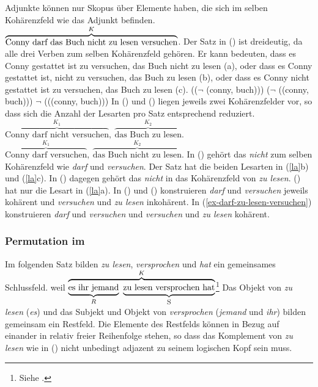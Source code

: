 Adjunkte können nur Skopus über Elemente haben, die sich im selben Kohärenzfeld
wie das Adjunkt befinden.
\ea
\label{ex-darf-zu-lesen-versuchen}
$\overbrace{ \mbox{Conny darf\iw{dürfen} das Buch nicht zu lesen versuchen} }^{K}$.
\z
Der Satz in () ist dreideutig, da alle drei Verben zum selben Kohärenzfeld
gehören. Er kann bedeuten, dass es Conny gestattet ist zu versuchen,
das Buch nicht zu lesen (a), oder dass es Conny gestattet ist, nicht zu versuchen, das Buch zu lesen (b),
oder dass es Conny nicht gestattet ist zu versuchen, das Buch zu lesen (c).
\eal
\label{la}
\ex {}(($\neg$ (conny, buch)))
\ex {}($\neg$ ((conny, buch)))
\ex $\neg$ (((conny, buch)))
\zl
In () und () liegen jeweils zwei Kohärenzfelder vor, so dass
sich die Anzahl der Lesarten pro Satz entsprechend reduziert.
\ea
$\overbrace{ \mbox{Conny darf nicht versuchen}}^{K_1},~\overbrace{\mbox{das Buch zu lesen}}^{K_2}$.
\z
\ea
$\overbrace{ \mbox{Conny darf versuchen}}^{K_1},~\overbrace{\mbox{das Buch nicht zu lesen}}^{K_2}$.
\z
In () gehört das \emph{nicht} zum selben Kohärenzfeld wie \emph{darf}
und \emph{versuchen}. Der Satz hat die beiden Lesarten in (\ref{la}b) und (\ref{la}c).
In () dagegen gehört das \emph{nicht} in das Kohärenzfeld
von \emph{zu lesen}. () hat nur die Lesart in (\ref{la}a). In () und ()
konstruieren \emph{darf} und \emph{versuchen} jeweils kohärent und \emph{versuchen} und \emph{zu
lesen} inkohärent. In (\ref{ex-darf-zu-lesen-versuchen}) konstruieren \emph{darf} und
\emph{versuchen} und \emph{versuchen} und \emph{zu lesen} kohärent.

\subsubsection{Permutation im \mf}

Im folgenden Satz bilden \emph{zu lesen}, \emph{versprochen} und \emph{hat}
ein gemeinsames Schlussfeld.
\ea
\label{zu-lesen-versp}
weil $\overbrace{ \underbrace{\rule[-0.5ex]{0cm}{2.5ex}\mbox{es ihr jemand} }_{R}~
                    \underbrace{\rule[-0.5ex]{0cm}{2.5ex}\mbox{zu lesen versprochen\iw{versprechen} hat}}_{\mbox{\footnotesize S}}
                  }^{K}$\footnote{
        Siehe \textcites[]{Haider86c}[]{Haider90b}.
}
\z
Das Objekt von \emph{zu lesen} (\emph{es})
und das Subjekt und Objekt von \emph{versprochen} (\emph{jemand} und \emph{ihr})
bilden gemeinsam ein Restfeld. Die Elemente des Restfelds können in Bezug
auf einander in relativ freier Reihenfolge stehen, so dass das Komplement von \emph{zu lesen}
wie in () nicht unbedingt adjazent zu seinem logischen Kopf sein muss.

